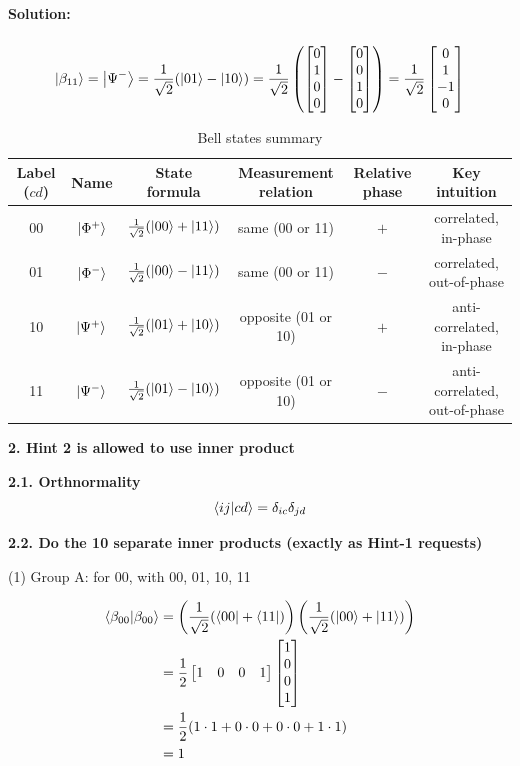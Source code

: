 \documentclass[11pt]{article}
\newenvironment{solution}
{\par\noindent\textbf{Solution:}\par}
{\vspace{1em}}
\begin{document}
\begin{solution}
\[\]
\[\ket{\beta_{11}} = \ket{\Psi^-} = \frac{1}{\sqrt{2}}(\ket{01} - \ket{10}) = \frac{1}{\sqrt{2}} \left (\begin{bmatrix}0\\1\\0\\0\end{bmatrix} - \begin{bmatrix}0\\0\\1\\0\end{bmatrix} \right) = \frac{1}{\sqrt{2}} \begin{bmatrix}0\\1\\-1\\0\end{bmatrix}
\]

\begin{table}[h]
\centering
\captionsetup{justification=raggedright,singlelinecheck=false,labelsep=period,labelfont=bf}
\caption{Bell states summary}
\begin{tabular}{cccccc}
\toprule
Label ($cd$) & Name & State formula & Measurement relation & Relative phase & Key intuition \\
\midrule
00 & $\ket{\Phi^+}$ & $\frac{1}{\sqrt{2}}(\ket{00}+\ket{11})$ & same (00 or 11) & $+$ & correlated, in-phase \\
01 & $\ket{\Phi^-}$ & $\frac{1}{\sqrt{2}}(\ket{00}-\ket{11})$ & same (00 or 11) & $-$ & correlated, out-of-phase \\
10 & $\ket{\Psi^+}$ & $\frac{1}{\sqrt{2}}(\ket{01}+\ket{10})$ & opposite (01 or 10) & $+$ & anti-correlated, in-phase \\
11 & $\ket{\Psi^-}$ & $\frac{1}{\sqrt{2}}(\ket{01}-\ket{10})$ & opposite (01 or 10) & $-$ & anti-correlated, out-of-phase \\
\bottomrule
\end{tabular}
\end{table}

\textbf{2. Hint 2 is allowed to use inner product}

\textbf{2.1. Orthnormality}
\[
\braket{ij}{cd} = \delta_{ic} \delta_{jd}
\]

\textbf{2.2. Do the 10 separate inner products (exactly as Hint-1 requests)}

(1) Group A: for 00, with 00, 01, 10, 11

\[\begin{aligned}
\braket{\beta_{00}} &= \left(\frac{1}{\sqrt{2}}(\bra{00} + \bra{11})\right) \left(\frac{1}{\sqrt{2}}(\ket{00} + \ket{11})\right) \\
&= \frac{1}{2} \begin{bmatrix}1&0&0&1\end{bmatrix} \begin{bmatrix}1\\0\\0\\1\end{bmatrix} \\
&= \frac{1}{2} (1 \cdot 1 + 0 \cdot 0 + 0 \cdot 0 + 1 \cdot 1) \\
&= 1
\end{aligned}\]


\end{solution}
\end{document}
